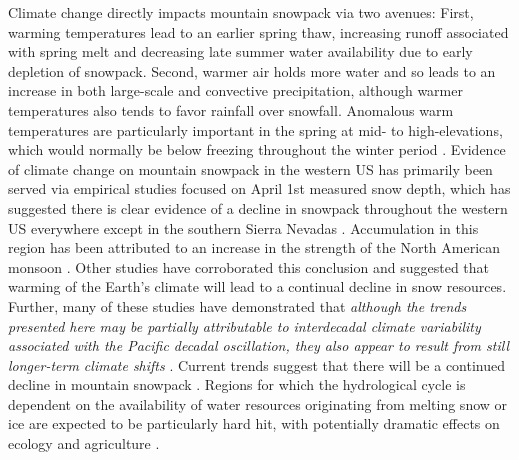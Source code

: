 \documentclass[11pt]{article}
\begin{document}

Climate change directly impacts mountain snowpack via two avenues: First, warming temperatures lead to an earlier spring thaw, increasing runoff associated with spring melt and decreasing late summer water availability due to early depletion of snowpack. Second, warmer air holds more water and so leads to an increase in both large-scale and convective precipitation, although warmer temperatures also tends to favor rainfall over snowfall. Anomalous warm temperatures are particularly important in the spring at mid- to high-elevations, which would normally be below freezing throughout the winter period \citep{cayan1996interannual,stewart2009changes}. Evidence of climate change on mountain snowpack in the western US has primarily been served via empirical studies focused on April 1st measured snow depth, which has suggested there is clear evidence of a decline in snowpack throughout the western US everywhere except in the southern Sierra Nevadas \citep{mote_declining_2005}. Accumulation in this region has been attributed to an increase in the strength of the North American monsoon \citep{dyer2006spatial}. Other studies have corroborated this conclusion \citep{dettinger1995large,mote_declining_2005,knowles2006trends} and suggested that warming of the Earth's climate will lead to a continual decline in snow resources. Further, many of these studies have demonstrated that \textit{although the trends presented here may be partially attributable to interdecadal climate variability associated with the Pacific decadal oscillation, they also appear to result from still longer-term climate shifts} \citep{knowles2006trends}. Current trends suggest that there will be a continued decline in mountain snowpack \citep{stewart2009changes}. Regions for which the hydrological cycle is dependent on the availability of water resources originating from melting snow or ice are expected to be particularly hard hit, with potentially dramatic effects on ecology and agriculture \citep{barnett2005potential}.
\end{document}
